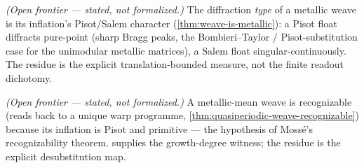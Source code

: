 \begin{theorem}\label{thm:weave-diffraction-pisot}\notready{}
\emph{(Open frontier --- stated, not formalized.)} The diffraction \emph{type} of a metallic
weave is its inflation's Pisot/Salem character (\cref{thm:weave-is-metallic}): a Pisot float
diffracts pure-point (sharp Bragg peaks, the Bombieri--Taylor / Pisot-substitution case for the
unimodular metallic matrices), a Salem float singular-continuously.  The residue is
the explicit translation-bounded measure, not the finite readout dichotomy.
\end{theorem}

\begin{theorem}\label{thm:metallic-weave-recognizable-mosse}\notready{}
\emph{(Open frontier --- stated, not formalized.)} A metallic-mean weave is recognizable
(reads back to a unique warp programme, \cref{thm:quasiperiodic-weave-recognizable}) because its
inflation is Pisot and primitive --- the hypothesis of Moss\'e's recognizability theorem.
 supplies the growth-degree witness; the residue is
the explicit desubstitution map.
\end{theorem}
